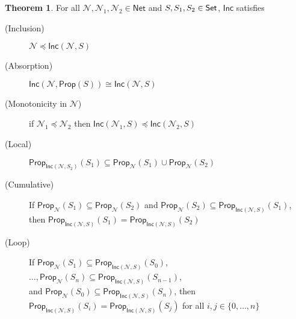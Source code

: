\documentclass[letterpaper]{article}
\theoremstyle{definition}
\newtheorem{theorem}{Theorem}
\newcommand{\Set}{\mbox{\sf Set}}
\newcommand{\set}[1]{\{ #1 \}}
\newcommand{\Prop}{\textsf{Prop}}
\newcommand{\Inc}{\textsf{Inc}}
\newcommand{\AllNets}{\mathsf{Net}}
\newcommand{\Net}{\mathcal{N}}
\begin{document}
\begin{theorem}
For all $\Net, \Net_1, \Net_2 \in \AllNets$ and $S, S_1, S_2 \in \Set$, $\Inc$ satisfies
\begin{description}
    \item[(Inclusion)]
    $\Net \preceq \Inc(\Net, S)$
    
    \item[(Absorption)]
    $\Inc(\Net, \Prop(S)) \cong \Inc(\Net, S)$
    
    \item[(Monotonicity in $\Net$)] if ${\Net_1 \preceq \Net_2}$
    then ${\Inc(\Net_1, S) \preceq \Inc(\Net_2, S)}$
    
    \item[(Local)]
    $\Prop_{\Inc(\Net, S_2)}(S_1) \subseteq \Prop_\Net(S_1) \cup \Prop_\Net(S_2)$
    
    \item[(Cumulative)] If ${\Prop_\Net(S_1) \subseteq \Prop_\Net(S_2)}$ and ${\Prop_\Net(S_2) \subseteq \Prop_{\Inc(\Net, S)}(S_1)}$,\\
    then $\Prop_{\Inc(\Net, S)}(S_1) = \Prop_{\Inc(\Net, S)}(S_2)$
    
    \item[(Loop)] If ${\Prop_\Net(S_1) \subseteq \Prop_{\Inc(\Net, S)}(S_0)}$,
    $\ldots, {\Prop_\Net(S_n) \subseteq \Prop_{\Inc(\Net, S)}(S_{n-1})}$,\\
    and 
    ${\Prop_\Net(S_0) \subseteq \Prop_{\Inc(\Net, S)}(S_n)}$,
    then ${\Prop_{\Inc(\Net, S)}(S_i) = \Prop_{\Inc(\Net, S)}(S_j)}$
    for all $i, j \in \set{0, \ldots, n}$
\end{description}
\label{thm:inc-props}
\end{theorem}
\end{document}
